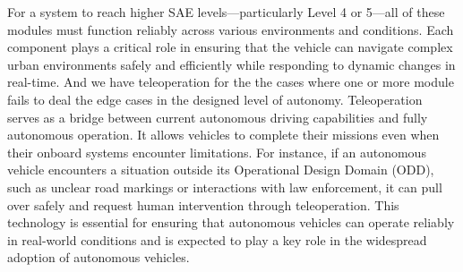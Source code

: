 For a system to reach higher SAE levels—particularly Level 4 or 5—all of
these modules must function reliably across various environments and conditions.
Each component plays a critical role in ensuring that the vehicle can navigate complex urban
environments safely and efficiently while responding to dynamic changes in real-time.
And we have teleoperation for the the cases where one or more module fails to deal the edge cases in the designed level of autonomy.
Teleoperation serves as a bridge between current autonomous driving capabilities and fully autonomous operation.
It allows vehicles to complete their missions even when their onboard systems encounter limitations.
For instance, if an autonomous vehicle encounters a situation outside its Operational Design Domain (ODD)\cite{iso34503},
such as unclear road markings or interactions with law enforcement, it can pull over safely and request human
intervention through teleoperation. This technology is essential for ensuring that autonomous vehicles
can operate reliably in real-world conditions and is expected to play a key role in the widespread adoption of autonomous vehicles.


